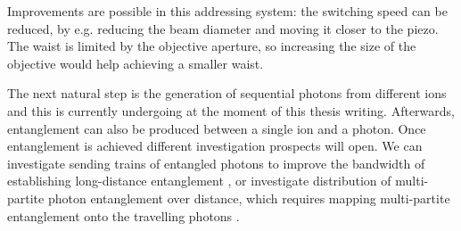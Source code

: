 Improvements are possible in this addressing system: the switching speed can be reduced, by e.g. reducing the beam diameter and moving it closer to the piezo. The waist is limited by the objective aperture, so increasing the size of the objective would help achieving a smaller waist.\par
The next natural step is the generation of sequential photons from different ions and this is currently undergoing at the moment of this thesis writing. Afterwards, entanglement can also be produced between a single ion and a photon. Once entanglement is achieved different investigation prospects will open. We can investigate sending trains of entangled photons to improve the bandwidth of establishing long-distance entanglement \cite{Krutyanskiy2019}, or investigate distribution of multi-partite photon entanglement over distance, which requires mapping multi-partite entanglement onto the travelling photons \cite{Arenskotter:19}.
